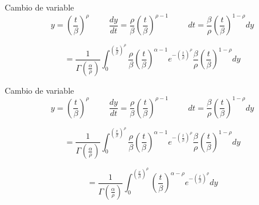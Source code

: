 \begin{frame}
    \begin{block}{Cambio de variable}
        \begin{equation*}
            y = \left( \frac{t}{\beta} \right)^\rho
            \hspace{1cm}
            \frac{dy}{dt} = \frac{\rho}{\beta} \left( \frac{t}{\beta} \right)^{\rho-1}
            \hspace{1cm}
            {dt} = \frac{\beta}{\rho} \left( \frac{t}{\beta} \right)^{1-\rho} dy
        \end{equation*}
    \end{block}

    \begin{equation*}
        = \frac{1}{\Gamma \left( \frac{\alpha}{\rho} \right)}\int_{0}^{\left( \frac{x}{\beta} \right)^\rho}
          \frac{\rho}{\beta} \left( \frac{t}{\beta} \right) ^{\alpha - 1} e^{-\left(\frac{t}{\beta}\right)^{\rho}} \frac{\beta}{\rho} \left( \frac{t}{\beta} \right)^{1-\rho} dy
    \end{equation*}
\end{frame}

\begin{frame}
    \begin{block}{Cambio de variable}
        \begin{equation*}
            y = \left( \frac{t}{\beta} \right)^\rho
            \hspace{1cm}
            \frac{dy}{dt} = \frac{\rho}{\beta} \left( \frac{t}{\beta} \right)^{\rho-1}
            \hspace{1cm}
            {dt} = \frac{\beta}{\rho} \left( \frac{t}{\beta} \right)^{1-\rho} dy
        \end{equation*}
    \end{block}

    \begin{equation*}
        = \frac{1}{\Gamma \left( \frac{\alpha}{\rho} \right)}\int_{0}^{\left( \frac{x}{\beta} \right)^\rho}
          \frac{\rho}{\beta} \left( \frac{t}{\beta} \right) ^{\alpha - 1} e^{-\left(\frac{t}{\beta}\right)^{\rho}} \frac{\beta}{\rho} \left( \frac{t}{\beta} \right)^{1-\rho} dy
    \end{equation*}

    \begin{equation*}
        = \frac{1}{\Gamma \left( \frac{\alpha}{\rho} \right)}\int_{0}^{\left( \frac{x}{\beta} \right)^\rho}
          \left( \frac{t}{\beta} \right) ^{\alpha - \rho} e^{-\left(\frac{t}{\beta}\right)^{\rho}} dy
    \end{equation*}
\end{frame}


